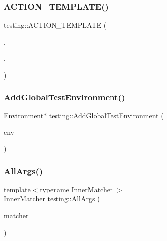 \subsubsection{\texorpdfstring{A\+C\+T\+I\+O\+N\+\_\+\+T\+E\+M\+P\+L\+A\+T\+E()}{ACTION\_TEMPLATE()}\hspace{0.1cm}{\footnotesize\ttfamily [28/28]}}
{\footnotesize\ttfamily testing\+::\+A\+C\+T\+I\+O\+N\+\_\+\+T\+E\+M\+P\+L\+A\+TE (\begin{DoxyParamCaption}\item[{Return\+New}]{,  }\item[{H\+A\+S\+\_\+1\+\_\+\+T\+E\+M\+P\+L\+A\+T\+E\+\_\+\+P\+A\+R\+A\+MS(typename, T)}]{,  }\item[{A\+N\+D\+\_\+10\+\_\+\+V\+A\+L\+U\+E\+\_\+\+P\+A\+R\+A\+MS(p0, p1, p2, p3, p4, p5, p6, p7, p8, p9)}]{ }\end{DoxyParamCaption})}

\mbox{\label{namespacetesting_a460d7b998622e332392c1e00be3a60d5}} 
\subsubsection{\texorpdfstring{Add\+Global\+Test\+Environment()}{AddGlobalTestEnvironment()}}
{\footnotesize\ttfamily \hyperlink{classtesting_1_1_environment}{Environment}$\ast$ testing\+::\+Add\+Global\+Test\+Environment (\begin{DoxyParamCaption}\item[{\hyperlink{classtesting_1_1_environment}{Environment} $\ast$}]{env }\end{DoxyParamCaption})\hspace{0.3cm}{\ttfamily [inline]}}

\mbox{\label{namespacetesting_a2522e94b71f88fbfbbcf6942cd0c6ee0}} 
\subsubsection{\texorpdfstring{All\+Args()}{AllArgs()}}
{\footnotesize\ttfamily template$<$typename Inner\+Matcher $>$ \\
Inner\+Matcher testing\+::\+All\+Args (\begin{DoxyParamCaption}\item[{const Inner\+Matcher \&}]{matcher }\end{DoxyParamCaption})\hspace{0.3cm}{\ttfamily [inline]}}

